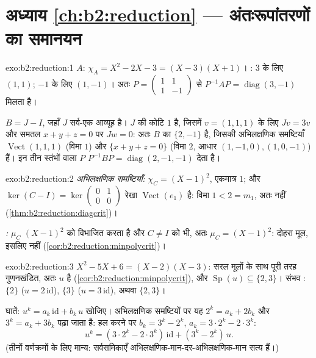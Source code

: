 \section*{अध्याय \ref{ch:b2:reduction} --- अंतःरूपांतरणों का समानयन}

\begin{solution}{exo:b2:reduction:1}
$A$: $\chi_A = X^2 - 2X - 3 = (X - 3)(X + 1)$। : $3$ के लिए $(1,1)$; $-1$ के लिए $(1,-1)$। अतः $P = \begin{pmatrix} 1 & 1\\ 1
& -1\end{pmatrix}$ से
$P^{-1}AP = \operatorname{diag}(3, -1)$ मिलता है।

$B = J - I$, जहाँ $J$ सर्व-एक आव्यूह है। $J$ की कोटि $1$ है, जिसमें $v = (1,1,1)$ के लिए
$Jv = 3v$ और समतल $x + y + z =
0$ पर $Jw = 0$: अतः $B$ का  $\{2, -1\}$ है, जिसकी अभिलक्षणिक
समष्टियाँ $\operatorname{Vect}(1,1,1)$ (विमा $1$) और $\{x + y + z = 0\}$ (विमा $2$, आधार $(1,-1,0), (1,0,-1)$) हैं। इन
तीन स्तंभों वाला $P$ $P^{-1}BP = \operatorname{diag}(2, -1, -1)$ देता है।
\end{solution}

\begin{solution}{exo:b2:reduction:2}
\emph{अभिलक्षणिक समष्टियाँ:} $\chi_C = (X-1)^2$, एकमात्र  $1$; और $\ker(C - I) = \ker\begin{pmatrix} 0&1\\ 0&0\end{pmatrix}$
रेखा $\operatorname{Vect}(e_1)$ है: विमा $1 < 2 = m_1$, अतः  नहीं (\cref{thm:b2:reduction:diagcrit})।

\emph{:} $\mu_C$ $(X-1)^2$ को विभाजित करता है और $C \neq I$ को भी, अतः
$\mu_C = (X-1)^2$: दोहरा मूल, इसलिए  नहीं (\cref{cor:b2:reduction:minpolycrit})।
\end{solution}

\begin{solution}{exo:b2:reduction:3}
$X^2 - 5X + 6 = (X-2)(X-3)$: सरल मूलों के साथ पूरी तरह गुणनखंडित, अतः $u$  है (\cref{cor:b2:reduction:minpolycrit}),
और $\operatorname{Sp}(u) \subseteq \{2, 3\}$। संभव : $\{2\}$ ($u = 2\,\mathrm{id}$), $\{3\}$ ($u = 3\,\mathrm{id}$), अथवा $\{2, 3\}$।

घातें: $u^k = a_k\,\mathrm{id} + b_k\,u$ खोजिए। अभिलक्षणिक समष्टियों पर यह $2^k = a_k + 2b_k$ और $3^k = a_k + 3b_k$ पढ़ा जाता है:
हल करने पर $b_k
= 3^k - 2^k$, $a_k = 3\cdot2^k - 2\cdot 3^k$:
\[
u^k = (3\cdot 2^k - 2\cdot 3^k)\,\mathrm{id} + (3^k - 2^k)\, u .
\]
(तीनों वर्णक्रमों के लिए मान्य: सर्वसमिकाएँ अभिलक्षणिक-मान-दर-अभिलक्षणिक-मान
सत्य हैं।)
\end{solution}

